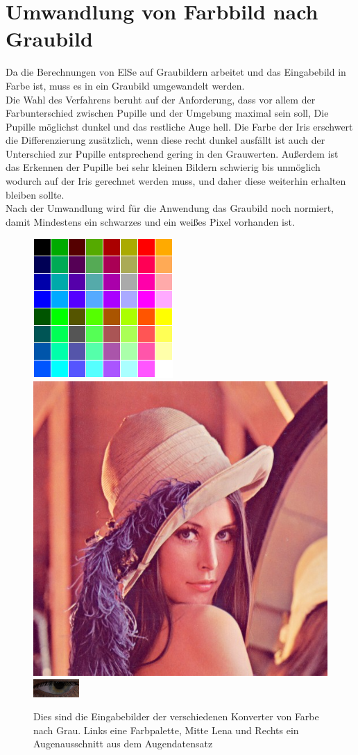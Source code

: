 \section{Umwandlung von Farbbild nach Graubild}
\label{Graubild}
Da die Berechnungen von ElSe auf Graubildern arbeitet und das Eingabebild in Farbe ist, muss es in ein Graubild umgewandelt werden.\\
Die Wahl des Verfahrens beruht auf der Anforderung, dass vor allem der Farbunterschied zwischen Pupille und der Umgebung maximal sein soll, Die Pupille möglichst dunkel und das restliche Auge hell. Die Farbe der Iris erschwert die Differenzierung zusätzlich, wenn diese recht dunkel ausfällt ist auch der Unterschied zur Pupille entsprechend gering in den Grauwerten. Außerdem ist das Erkennen der Pupille bei sehr kleinen Bildern schwierig bis unmöglich wodurch auf der Iris gerechnet werden muss, und daher diese weiterhin erhalten bleiben sollte.\\
Nach der Umwandlung wird für die Anwendung das Graubild noch normiert, damit Mindestens ein schwarzes und ein weißes Pixel vorhanden ist.
\begin{figure}
	\centering
	\includegraphics[width=0.2\linewidth]{img/Farbtafel2}
	\includegraphics[width=0.2\linewidth]{img/lena}
	\includegraphics[width=0.2\linewidth]{img/Auge}
	\caption{Dies sind die Eingabebilder der verschiedenen Konverter von Farbe nach Grau. Links eine Farbpalette, Mitte Lena und Rechts ein Augenausschnitt aus dem Augendatensatz \cite{database_Eye}}
	\label{img_Gray_Einagbe}
\end{figure}
